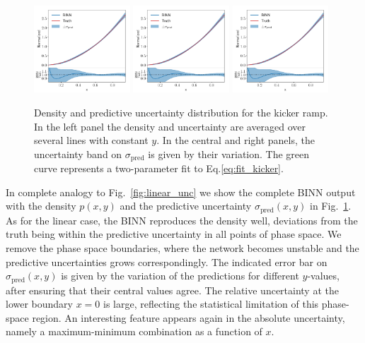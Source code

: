 \begin{figure}[t]
\centering
\includegraphics[width=0.32\textwidth, page=1]{./figures/bINN/quadratic_1dplots}
\includegraphics[width=0.32\textwidth, page=2]{./figures/bINN/quadratic_1dplots}
\includegraphics[width=0.32\textwidth, page=3]{./figures/bINN/quadratic_1dplots}
\caption{Density and predictive uncertainty distribution for the
  kicker ramp. In the left panel the density and uncertainty are
  averaged over several lines with constant $y$. In the central and
  right panels, the uncertainty band on $\sigma_\text{pred}$ is given
  by their variation.  The green curve represents a two-parameter fit
  to Eq.\eqref{eq:fit_kicker}.}
\label{fig:quadratic_unc}
\end{figure}

In complete analogy to Fig.~\ref{fig:linear_unc} we show the complete
BINN output with the density $p(x,y)$ and the predictive uncertainty
$\sigma_\text{pred}(x,y)$ in Fig.~\ref{fig:quadratic_unc}. As for the
linear case, the BINN reproduces the density well, deviations from the
truth being within the predictive uncertainty in all points of phase
space. We remove the phase space boundaries, where the network becomes
unstable and the predictive uncertainties grows correspondingly.  The
indicated error bar on $\sigma_\text{pred}(x,y)$ is given by the
variation of the predictions for different $y$-values, after ensuring
that their central values agree.  The relative uncertainty at the
lower boundary $x = 0$ is large, reflecting the statistical limitation
of this phase-space region. An interesting feature appears again in
the absolute uncertainty, namely a maximum-minimum combination as a
function of $x$.

